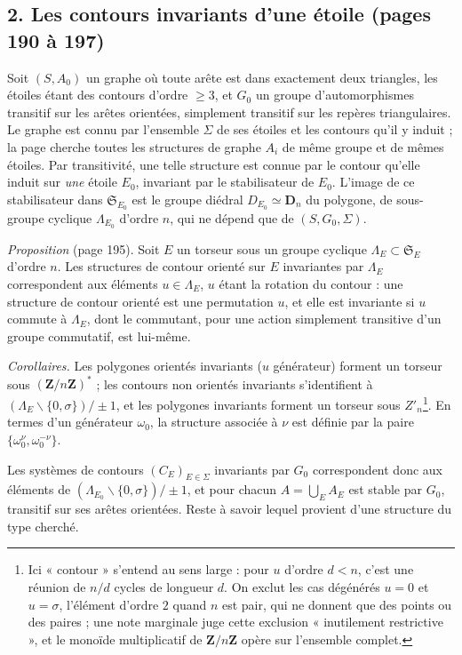 \documentclass[11pt,a4paper]{article}
\begin{document}
\subsection*{2. Les contours invariants d'une étoile (pages 190 à 197)}

Soit $(S, A_0)$ un graphe où toute arête est dans exactement deux triangles, les
étoiles étant des contours d'ordre $\geq 3$, et $G_0$ un groupe
d'automorphismes transitif sur les arêtes orientées, simplement transitif sur
les repères triangulaires. Le graphe est connu par l'ensemble $\Sigma$ de ses
étoiles et les contours qu'il y induit ; la page cherche toutes les structures
de graphe $A_i$ de même groupe et de mêmes étoiles. Par transitivité, une telle
structure est connue par le contour qu'elle induit sur \emph{une} étoile $E_0$,
invariant par le stabilisateur de $E_0$. L'image de ce stabilisateur dans
$\mathfrak{S}_{E_0}$ est le groupe diédral $D_{E_0} \simeq \mathbf{D}_n$ du
polygone, de sous-groupe cyclique $\Lambda_{E_0}$ d'ordre $n$, qui ne dépend
que de $(S, G_0, \Sigma)$.

\emph{Proposition} (page 195). Soit $E$ un torseur sous un groupe cyclique
$\Lambda_E \subset \mathfrak{S}_E$ d'ordre $n$. Les structures de contour
orienté sur $E$ invariantes par $\Lambda_E$ correspondent aux éléments $u \in
\Lambda_E$, $u$ étant la rotation du contour : une structure de contour orienté
est une permutation $u$, et elle est invariante si $u$ commute à $\Lambda_E$,
dont le commutant, pour une action simplement transitive d'un groupe
commutatif, est lui-même.

\emph{Corollaires.} Les polygones orientés invariants ($u$ générateur) forment
un torseur sous $(\mathbf{Z}/n\mathbf{Z})^{*}$ ; les contours non orientés
invariants s'identifient à $(\Lambda_E \smallsetminus \{0, \sigma\})/\pm 1$, et
les polygones invariants forment un torseur sous $Z'_n$\footnote{Ici
« contour » s'entend au sens large : pour $u$ d'ordre $d < n$, c'est une réunion
de $n/d$ cycles de longueur $d$. On exclut les cas dégénérés $u = 0$ et $u =
\sigma$, l'élément d'ordre $2$ quand $n$ est pair, qui ne donnent que des points
ou des paires ; une note marginale juge cette exclusion « inutilement
restrictive », et le monoïde multiplicatif de $\mathbf{Z}/n\mathbf{Z}$ opère
sur l'ensemble complet.}. En termes d'un générateur $\omega_0$, la structure
associée à $\nu$ est définie par la paire $\{\omega_0^{\nu}, \omega_0^{-\nu}\}$.

Les systèmes de contours $(C_E)_{E \in \Sigma}$ invariants par $G_0$
correspondent donc aux éléments de $(\Lambda_{E_0} \smallsetminus \{0,
\sigma\})/\pm 1$, et pour chacun $A = \bigcup_E A_E$ est stable par $G_0$,
transitif sur ses arêtes orientées. Reste à savoir lequel provient d'une
structure du type cherché.
\end{document}
